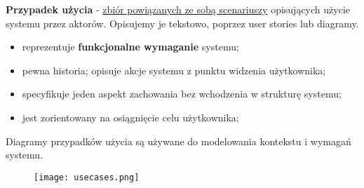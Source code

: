 \documentclass[a4paper]{article}
\begin{document}
    \textbf{Przypadek użycia} - \underline{zbiór powiązanych ze sobą scenariuszy} opisujących użycie systemu przez aktorów.
    Opisujemy je tekstowo, poprzez user stories lub diagramy.
    \begin{itemize}
        \item reprezentuje \textbf{funkcjonalne wymaganie} systemu;
        \item pewna historia; opisuje akcje systemu z punktu widzenia użytkownika;
        \item specyfikuje jeden aspekt zachowania bez wchodzenia w strukturę systemu;
        \item jest zorientowany na osiągnięcie celu użytkownika;
    \end{itemize}
    Diagramy przypadków użycia są używane do modelowania kontekstu i wymagań systemu.

    \begin{figure}[H]
        \texttt{[image: usecases.png]}
    \end{figure}
\end{document}
